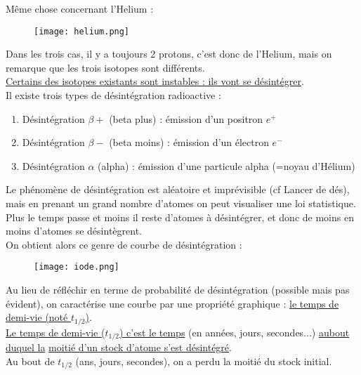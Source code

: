 \documentclass[a4paper]{article}
\begin{document}
\begin{Large}
\noindent Même chose concernant l'Helium : 
\begin{figure}[H]
\vspace*{-0.4cm}
\begin{center}
\texttt{[image: helium.png]} 
\end{center}
\end{figure}
\vspace*{-1.4cm}
\noindent Dans les trois cas, il y a toujours 2 protons, c'est donc de l'Helium, mais on remarque que les trois isotopes sont différents.\\

\noindent \underline{Certains des isotopes existants sont instables : ils vont se désintégrer}.\\

\noindent Il existe trois types de désintégration radioactive :
\begin{enumerate}
\item Désintégration $\beta +$ (beta plus) : émission d'un positron $e^+$
\item Désintégration $\beta -$ (beta moins) : émission d'un électron $e^-$
\item Désintégration $\alpha$ (alpha) : émission d'une particule alpha (=noyau d'Hélium)\\
\end{enumerate}

\noindent Le phénomène de désintégration est aléatoire et imprévisible (cf Lancer de dés), mais en prenant un grand nombre d'atomes on peut visualiser une loi statistique.\\
Plus le temps passe et moins il reste d'atomes à désintégrer, et donc de moins en moins d'atomes se désintègrent.\\

\noindent On obtient alors ce genre de courbe de désintégration :
\begin{figure}[H]
\begin{center}
\texttt{[image: iode.png]}
\end{center}
\end{figure}
\noindent Au lieu de réfléchir en terme de probabilité de désintégration (possible mais pas évident), on caractérise une courbe par une propriété graphique : \underline{le temps de demi-vie (noté $t_{1/2}$)}.\\

\noindent \underline{Le temps de demi-vie ($t_{1/2}$) c'est le temps} (en années, jours, secondes...) \underline{aubout duquel la} \underline{moitié d'un stock d'atome s'est désintégré}.\\
Au bout de $t_{1/2}$ (ans, jours, secondes), on a perdu la moitié du stock initial.\\


\end{Large}
\end{document}
